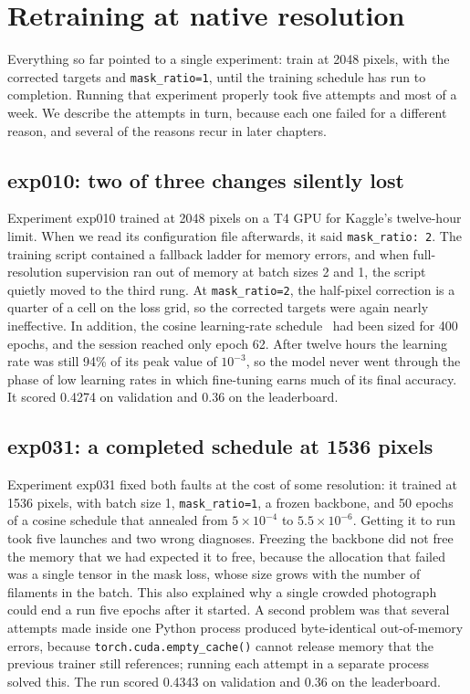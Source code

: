\section{Retraining at native resolution}\label{sec:yolo-retrain}
Everything so far pointed to a single experiment: train at 2048 pixels, with the corrected targets
and \texttt{mask\_ratio=1}, until the training schedule has run to completion. Running that experiment
properly took five attempts and most of a week. We describe the attempts in turn, because each one
failed for a different reason, and several of the reasons recur in later chapters.

\subsection{exp010: two of three changes silently lost}\label{sec:yolo-exp010}
Experiment exp010 trained at 2048 pixels on a T4 GPU for Kaggle's twelve-hour limit. When we read
its configuration file afterwards, it said \texttt{mask\_ratio: 2}. The training script contained a
fallback ladder for memory errors, and when full-resolution supervision ran out of memory at batch
sizes 2 and 1, the script quietly moved to the third rung. At \texttt{mask\_ratio=2}, the half-pixel
correction is a quarter of a cell on the loss grid, so the corrected targets were again nearly
ineffective. In addition, the cosine learning-rate schedule~\citep{sgdr} had been sized for 400 epochs, and the
session reached only epoch 62. After twelve hours the learning rate was still 94\% of its peak value
of $10^{-3}$, so the model never went through the phase of low learning rates in which fine-tuning
earns much of its final accuracy. It scored 0.4274 on validation and 0.36 on the leaderboard.

\subsection{exp031: a completed schedule at 1536 pixels}\label{sec:yolo-exp031}
Experiment exp031 fixed both faults at the cost of some resolution: it trained at 1536 pixels, with
batch size 1, \texttt{mask\_ratio=1}, a frozen backbone, and 50 epochs of a cosine schedule that
annealed from $5\times10^{-4}$ to $5.5\times10^{-6}$. Getting it to run took five launches and two
wrong diagnoses. Freezing the backbone did not free the memory that we had expected it to free,
because the allocation that failed was a single tensor in the mask loss, whose size grows with the
number of filaments in the batch. This also explained why a single crowded photograph could end a
run five epochs after it started. A second problem was that several attempts made inside one
Python process produced byte-identical out-of-memory errors, because \texttt{torch.cuda.empty\_cache()} cannot
release memory that the previous trainer still references; running each attempt in a separate
process solved this. The run scored 0.4343 on validation and 0.36 on the leaderboard.


